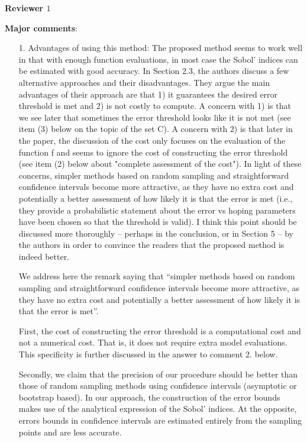 \documentclass[10pt,a4paper]{article}
\begin{document}
\textbf{\large{Reviewer $1$}}
\vspace*{0.5cm}

\textbf{Major comments}:

\begin{itemize}
\item[1.] Advantages of using this method: The proposed method seems to work well in that with enough function evaluations, in most case the Sobol' indices can be estimated with good accuracy. In Section 2.3, the authors discuss a few alternative approaches and their disadvantages. They argue the main advantages of their approach are that 1) it guarantees the desired error threshold is met and 2) is not costly to compute. A concern with 1) is that we see later that sometimes the error threshold looks like it is not met (see item (3) below on the topic of the set C). A concern with 2) is that later in the paper, the discussion of the cost only focuses on the evaluation of the function f and seems to ignore the cost of constructing the error threshold (see item (2) below about "complete assessment of the cost"). In light of these concerns, simpler methods based on random sampling and straightforward confidence intervals become more attractive, as they have no extra cost and potentially a better assessment of how likely it is that the error is met (i.e., they provide a probabilistic statement about the error vs hoping parameters have been chosen so that the threshold is valid). I think this point should be discussed more thoroughly -- perhaps in the conclusion, or in Section 5 -- by the authors in order to convince the readers that the proposed method is indeed better.

{\color{blue} We address here the remark saying that ``simpler methods based on random sampling and straightforward confidence intervals become more attractive, as they have no extra cost and potentially a better assessment of how likely it is that the error is met''. 

First, the cost of constructing the error threshold is a computational cost and not a numerical cost. That is, it does not require extra model evaluations. This specificity is further discussed in the answer to comment 2. below.

Secondly, we claim that the precision of our procedure should be better than those of random sampling methods using confidence intervals (asymptotic or bootstrap based). In our approach, the construction of the error bounds makes use of the analytical expression of the Sobol' indices. At the opposite, errors bounds in confidence intervals are estimated entirely from the sampling points and are less accurate.

}
\end{itemize}
\end{document}
